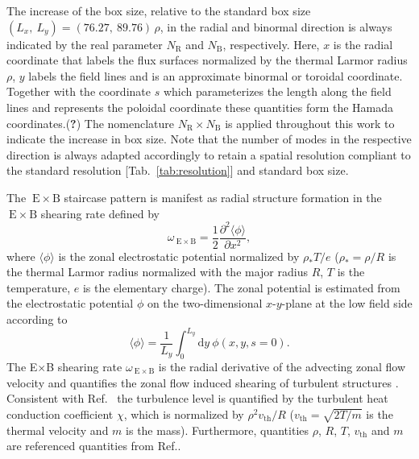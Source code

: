 \documentclass[aip, amsmath, amssymb, reprint, twocolumn, floatfix]{revtex4-1}
\newcommand{\wexb}{\omega_{\mathrm{\:E \times B}}}
\newcommand{\exb}{\mathrm{\:E}\times\mathrm{B}}
\newcommand{\NR}{N_\mathrm{R}}
\newcommand{\NB}{N_\mathrm{B}}
\newcommand{\rhoth}{\rho}
\newcommand{\vth}{v_{\mathrm{th}}}
\newcommand{\xcoord}{x}
\newcommand{\ycoord}{y}
\begin{document}
The increase of the box size, relative to the standard box size $(L_\xcoord,~L_\ycoord) = (76.27,~89.76)\,\rhoth$, in the radial and binormal direction is always indicated by the real parameter $\NR$ and $\NB$, respectively. Here, $\xcoord$ is the radial coordinate that labels the flux surfaces normalized by the thermal Larmor radius $\rhoth$, $\ycoord$ labels the field lines and is an approximate binormal or toroidal coordinate. Together with the coordinate $s$ which parameterizes the length along the field lines and represents the poloidal coordinate these quantities form the Hamada coordinates.(\textbf{?})
The nomenclature $\NR\times \NB$ is applied throughout this work to indicate the increase in box size.  
Note that the number of modes in the respective direction is always adapted accordingly to retain a spatial resolution compliant to the standard resolution [Tab.~\ref{tab:resolution}] and standard box size. \bigskip

The $\exb$ staircase pattern is manifest as radial structure formation in the $\exb$ shearing rate defined by\cite{rath2016, doi:10.1063/1.3005380, rath2016, peeters2016}
\begin{equation}
	\wexb = \frac{1}{2} \frac{\partial^2 \langle \phi \rangle}{\partial \xcoord^2},
	\label{eq:shearingrate}
\end{equation}
where $\langle \phi \rangle$ is the zonal electrostatic potential normalized by $\rho_\ast T/e$ ($\rho_\ast = \rhoth/R$ is the thermal Larmor radius normalized with the major radius $R$, $T$ is the temperature, $e$ is the elementary charge).
The zonal potential is estimated from the electrostatic potential $\phi$ on the two-dimensional $\xcoord$-$\ycoord$-plane at the low field side according to\cite{rath2021}
\begin{equation}
\langle \phi \rangle = \frac{1}{L_\ycoord} \int_0^{L_\ycoord} \mathrm{d}\ycoord ~ \phi(\xcoord,\ycoord,s=0).
\end{equation}
The E$\times$B shearing rate $\wexb$ is the radial derivative of the advecting zonal flow velocity \cite{doi:10.1063/1.871313, doi:10.1063/1.872847} and quantifies the zonal flow induced shearing of turbulent structures \cite{doi:10.1063/1.859529, doi:10.1063/1.871313, doi:10.1063/1.872367}. \\
Consistent with Ref.~\cite{peeters2016} the turbulence level is quantified by the turbulent heat conduction coefficient $\chi$, which is normalized by $\rhoth^2 \vth/R$ ($\vth = \sqrt{2 T/m}$ is the thermal velocity and $m$ is the mass). Furthermore, quantities $\rhoth$, $R$, $T$, $\vth$ and $m$ are referenced quantities from Ref.\cite{peeters2016,peeters2009}.
\end{document}
